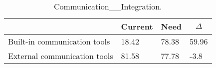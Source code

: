 
  \begin{table*}[]
  \centering
  \notsotiny
  \caption{ Communication__Integration.}
\label{tab:communication__integration}
\begin{tabular}{|l|l|l|l|}
  \hline
  \rowcolor[HTML]{C0C0C0}
    \multicolumn{1}{|c|}{Feature} & \multicolumn{1}{c|}{Current} & \multicolumn{1}{c|}{Need} & \multicolumn{1}{c|}{$\Delta$} \\ \hline
  Built-in communication tools & 18.42 & 78.38 & 59.96 \\ \hline 
External communication tools & 81.58 & 77.78 & -3.8 \\ \hline 
\end{tabular}%
  \end{table*}